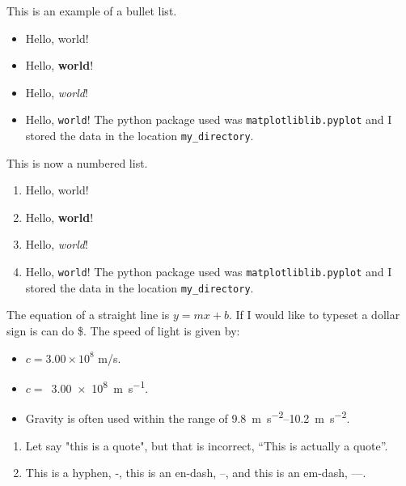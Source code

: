 \documentclass{article}
\begin{document}
This is an example of a bullet list.
\begin{itemize}
  \item Hello, world!
  \item Hello, \textbf{world}!
  \item Hello, \textit{world}!
  \item Hello, \texttt{world}! The python package used was \texttt{matplotliblib.pyplot} and I stored the data in the location \texttt{my\_directory}.
\end{itemize}

This is now a numbered list.

\begin{enumerate}[a - ]
  \item Hello, world!
  \item Hello, \textbf{world}!
  \item Hello, \textit{world}!
  \item Hello, \texttt{world}! The python package used was \texttt{matplotliblib.pyplot} and I stored the data in the location \texttt{my\_directory}.
\end{enumerate}

The equation of a straight line is $y = mx + b$. If I would like to typeset a dollar sign is can do \$. The speed of light is given by:
\begin{itemize}
  \item $c = 3.00 \times 10^{8}$ m/s.
  \item $c = $~\qty{3.00e8}{\meter\per\second}.
  \item Gravity is often used within the range of \qtyrange[range-units = single]{9.8}{10.2}{\meter\per\second\squared}.
\end{itemize}

\begin{enumerate}[{Random} a)]
  \item Let say "this is a quote", but that is incorrect, ``This is actually a quote''.
  \item This is a hyphen, -, this is an en-dash, --, and this is an em-dash, ---.
\end{enumerate}
\end{document}
